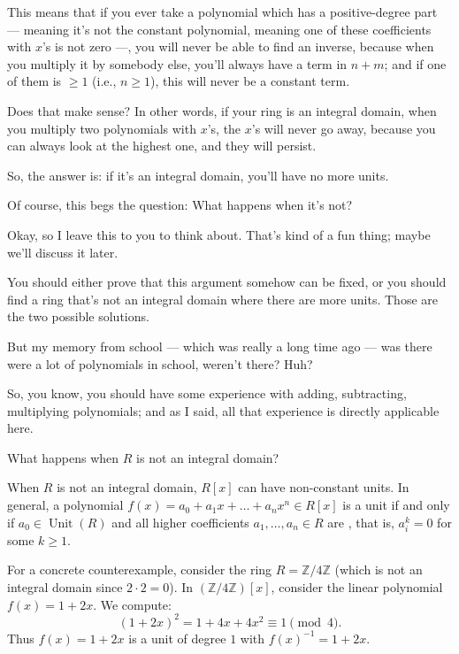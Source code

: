 \begin{speech}[00:23:22 - 00:25:19]
This means that if you ever take a polynomial which has a positive-degree part --- meaning it's not the constant polynomial, meaning one of these coefficients with $x$'s is not zero ---, you will never be able to find an inverse, because when you multiply it by somebody else, you'll always have a term in $n+m$; and if one of them is $\ge 1$ (i.e., $n \ge 1$), this will never be a constant term.

Does that make sense? In other words, if your ring is an integral domain, when you multiply two polynomials with $x$'s, the $x$'s will never go away, because you can always look at the highest one, and they will persist.

So, the answer is: if it's an integral domain, you'll have no more units.

Of course, this begs the question: What happens when it's not? 

Okay, so I leave this to you to think about. That's kind of a fun thing; maybe we'll discuss it later.

You should either prove that this argument somehow can be fixed, or you should find a ring that's not an integral domain where there are more units. Those are the two possible solutions.

But my memory from school --- which was really a long time ago --- was there were a lot of polynomials in school, weren't there? Huh?

So, you know, you should have some experience with adding, subtracting, multiplying polynomials; and as I said, all that experience is directly applicable here.
\end{speech}

\begin{content}
\begin{question}
What happens when $R$ is not an integral domain?
\end{question}
\end{content}

\begin{aiNote}
When $R$ is not an integral domain, $R[x]$ can have non-constant units. In general, a polynomial $f(x) = a_0 + a_1 x + \dots + a_n x^n \in R[x]$ is a unit if and only if $a_0 \in \operatorname{Unit}(R)$ and all higher coefficients $a_1, \dots, a_n \in R$ are , that is, $a_i^k = 0$ for some $k \ge 1$. 

For a concrete counterexample, consider the ring $R = \mathbb{Z}/4\mathbb{Z}$ (which is not an integral domain since $2 \cdot 2 = 0$). In $(\mathbb{Z}/4\mathbb{Z})[x]$, consider the linear polynomial $f(x) = 1 + 2x$. We compute:
\[
(1 + 2x)^2 = 1 + 4x + 4x^2 \equiv 1 \pmod 4.
\]
Thus $f(x) = 1 + 2x$ is a unit of degree $1$ with $f(x)^{-1} = 1 + 2x$.
\end{aiNote}

